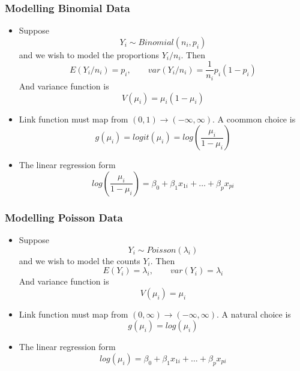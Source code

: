 \documentclass[10pt,xcolor={svgnames},t]{beamer}
\begin{document}
%
%
\begin{frame}
	\frametitle{Modelling Binomial Data}
	
	\begin{itemize}
		\item Suppose
		\[
		Y_i \sim Binomial(n_i , p_i)
		\]
		and we wish to model the proportions $Y_i / n_i$. Then
		\[ E(Y_i /n_i)=p_i , \qquad var(Y_i /n_i ) = \frac{1}{n_i } p_i (1-p_i )
		\]
		And variance function is 
		\[ V(\mu_i )=\mu_i ( 1-\mu_i)
		\]
		
		\item Link function must map from $(0,1) \rightarrow (-\infty, \infty)$. A coommon choice is 
		\[ 	g(\mu_i ) = logit(\mu_i )=log(\frac{\mu_i}{1-\mu_i})
		\]
				\item The linear regression form
				\[ 	log(\frac{\mu_i}{1-\mu_i})= \beta_0 + \beta_1 x_{1i} + \ldots + \beta_p x_{pi} 
				\]
	\end{itemize}
	
	
\end{frame}
%
%
\begin{frame}
	\frametitle{Modelling Poisson Data}
	
	\begin{itemize}
		\item Suppose
		\[
		Y_i \sim Poisson(\lambda_i)
		\]
		and we wish to model the counts $Y_i $. Then
		\[ E(Y_i )=\lambda_i , \qquad var(Y_i ) = \lambda_i
		\]
		And variance function is 
		\[ V(\mu_i )=\mu_i 
		\]
		
		\item Link function must map from $(0,\infty) \rightarrow (-\infty, \infty)$. A natural choice is 
		\[ 	g(\mu_i ) = log(\mu_i )
		\]
						\item The linear regression form
						\[ 	log(\mu_i)= \beta_0 + \beta_1 x_{1i} + \ldots + \beta_p x_{pi} 
						\]
	\end{itemize}
	
	
\end{frame}
%
%
%
\end{document}
